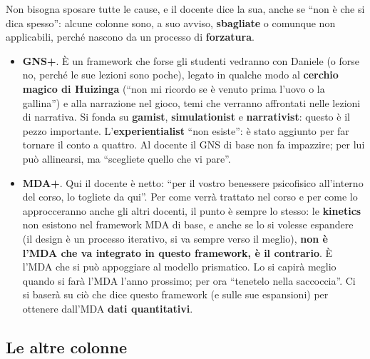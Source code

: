 Non bisogna sposare tutte le cause, e il docente dice la sua, anche se ``non è che
si dica spesso'': alcune colonne sono, a suo avviso, \textbf{sbagliate} o comunque
non applicabili, perché nascono da un processo di \textbf{forzatura}.
\begin{itemize}
  \item \textbf{GNS+}. È un framework che forse gli studenti vedranno con Daniele (o
        forse no, perché le sue lezioni sono poche), legato in qualche modo al
        \textbf{cerchio magico di Huizinga} (``non mi ricordo se è venuto prima
        l'uovo o la gallina'') e alla narrazione nel gioco, temi che verranno
        affrontati nelle lezioni di narrativa. Si fonda su \textbf{gamist},
        \textbf{simulationist} e \textbf{narrativist}: questo è il pezzo importante.
        L'\textbf{experientialist} ``non esiste'': è stato aggiunto per far tornare
        il conto a quattro. Al docente il GNS di base non fa impazzire; per lui può
        allinearsi, ma ``scegliete quello che vi pare''.
  \item \textbf{MDA+}. Qui il docente è netto: ``per il vostro benessere psicofisico
        all'interno del corso, lo togliete da qui''. Per come verrà trattato nel corso
        e per come lo approcceranno anche gli altri docenti, il punto è sempre lo
        stesso: le \textbf{kinetics} non esistono nel framework MDA di base, e anche
        se lo si volesse espandere (il design è un processo iterativo, si va sempre
        verso il meglio), \textbf{non è l'MDA che va integrato in questo framework,
        è il contrario}. È l'MDA che si può appoggiare al modello prismatico. Lo si
        capirà meglio quando si farà l'MDA l'anno prossimo; per ora ``tenetelo nella
        saccoccia''. Ci si baserà su ciò che dice questo framework (e sulle sue
        espansioni) per ottenere dall'MDA \textbf{dati quantitativi}.
\end{itemize}

\subsection{Le altre colonne}


